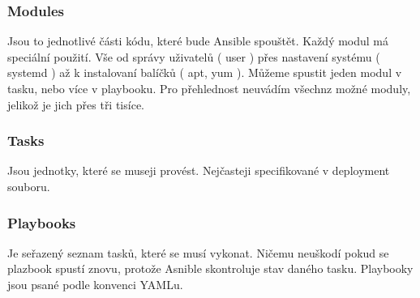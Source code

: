 \subsubsection{Modules}

Jsou to jednotlivé části kódu, které bude Ansible spouštět. Každý modul má speciální použití. Vše od správy uživatelů ( user ) přes nastavení systému ( systemd ) až k instalovaní balíčků ( apt, yum ). Můžeme spustit jeden modul v tasku, nebo více v playbooku. Pro přehlednost neuvádím všechnz možné moduly, jelikož je jich přes tři tisíce. 

\subsubsection{Tasks}

Jsou jednotky, které se museji provést. Nejčasteji specifikované v deployment souboru. 

\subsubsection{Playbooks}

Je seřazený seznam tasků, které se musí vykonat. Ničemu neuškodí pokud se plazbook spustí znovu, protože Asnible skontroluje stav daného tasku. Playbooky jsou psané podle konvenci YAMLu. 
